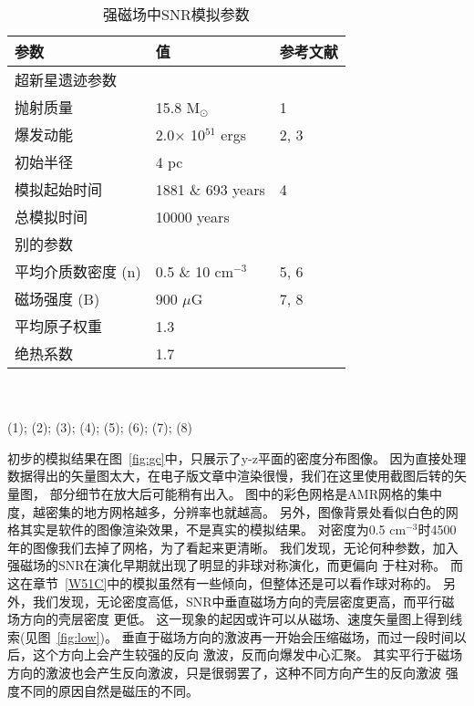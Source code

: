 \begin{table}
  \caption{强磁场中SNR模拟参数}
  \label{table:parameters}
  \centering
  \begin{tabular}{l l l}
      \hline\hline
      参数                      & 值            & 参考文献               \\
      \hline
      超新星遗迹参数\\
      \hline
      抛射质量                    & 15.8 M$_{\odot}$ & 1\\
      爆发动能                    & 2.0$\times$ 10$^{51}$ ergs & 2, 3\\
      初始半径                    & 4 pc             &\\
      模拟起始时间                & 1881 $\&$ 693 years        & 4\\
      总模拟时间                  & 10000 years\\
      \hline
      别的参数\\
      \hline
      平均介质数密度 (n)         & 0.5 $\&$ 10 cm$^{-3}$   & 5, 6\\
      磁场强度 (B)              & 900 $\mu$G   & 7, 8\\
      平均原子权重              & 1.3              &\\
      绝热系数                  & 1.7              &\\
      \hline
  \end{tabular}\\
  ~\\
  (1)\citealt{Sukhbold2016}; (2)\citealt{Poznanski2013}; (3)\citealt{Mueller2016a}; (4)\citealt{Leahy2017a};
  (5)\citealt{Nakanishi2006}; (6)\citealt{Nakanishi2016}; (7)\citealt{Haverkorn2015}; (8)\citealt{Ferriere2009}
\end{table}

初步的模拟结果在图~\ref{fig:gc}中，只展示了y-z平面的密度分布图像。
因为直接处理数据得出的矢量图太大，在电子版文章中渲染很慢，我们在这里使用截图后转的矢量图，
部分细节在放大后可能稍有出入。
图中的彩色网格是AMR网格的集中度，越密集的地方网格越多，分辨率也就越高。
另外，图像背景处看似白色的网格其实是软件的图像渲染效果，不是真实的模拟结果。
对密度为0.5 cm$^{-3}$时4500年的图像我们去掉了网格，为了看起来更清晰。
我们发现，无论何种参数，加入强磁场的SNR在演化早期就出现了明显的非球对称演化，而更偏向
于柱对称。
而这在章节~\ref{W51C}中的模拟虽然有一些倾向，但整体还是可以看作球对称的。
另外，我们发现，无论密度高低，SNR中垂直磁场方向的壳层密度更高，而平行磁场方向的壳层密度
更低。
这一现象的起因或许可以从磁场、速度矢量图上得到线索(见图~\ref{fig:low})。
垂直于磁场方向的激波再一开始会压缩磁场，而过一段时间以后，这个方向上会产生较强的反向
激波，反而向爆发中心汇聚。
其实平行于磁场方向的激波也会产生反向激波，只是很弱罢了，这种不同方向产生的反向激波
强度不同的原因自然是磁压的不同。

